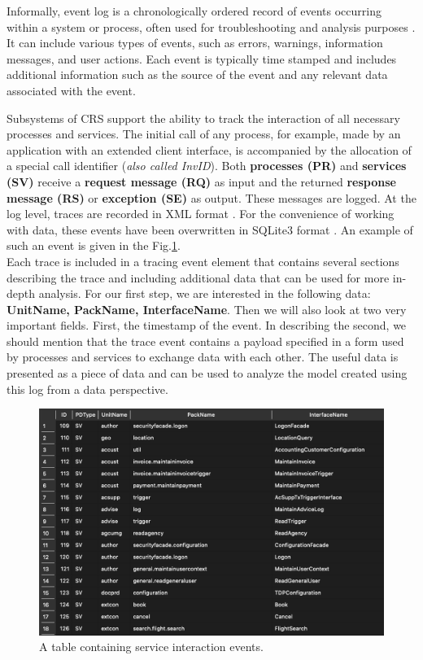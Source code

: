 \documentclass[12pt, times]{article}
\begin{document}
	\hspace*{5mm} Informally, event log is a chronologically ordered record of events occurring within a system or process, often used for troubleshooting and analysis purposes \cite{event_logs}. It can include various types of events, such as errors, warnings, information messages, and user actions. Each event is typically time stamped and includes additional information such as the source of the event and any relevant data associated with the event.
	
	\hspace*{5mm}Subsystems of CRS support the ability to track the interaction of all necessary processes and services. The initial call of any process, for example, made by an application with an extended client interface, is accompanied by the allocation of a special
	call identifier (\textit{also called InvID}). Both \textbf{processes (PR)} and \textbf{services (SV)} receive a \textbf{request message (RQ)} as input and the returned \textbf{response message (RS)} or \textbf{exception (SE)} as output. These messages are logged. At the log level, traces are recorded in XML format \cite{xml}. For the convenience of working with data, these events have been overwritten \cite{multi_perspective} in SQLite3 format \cite{sqlite3}. An example of such an event is given in the 
	Fig.\ref{fig:Interfaces1}.\\
	\hspace*{5mm}Each trace is included in a tracing event element that contains several sections describing the trace and including additional data that can be used for more in-depth analysis. For our first step, we are interested in the following data: \textbf{UnitName, PackName, InterfaceName}. Then we will also look at two very important fields. First, the timestamp of the event. In describing the second, we should mention that the trace event contains a payload specified in a form used by processes and services to exchange data with each other. The useful data is presented as a piece of data and can be used to analyze the model created using this log from a data perspective. 
	
	\begin{figure}
		\centering
		\includegraphics[scale=0.7]{Interfaces1}
		\caption{A table containing service interaction events.}
		\label{fig:Interfaces1}
	\end{figure}
	
\end{document}
